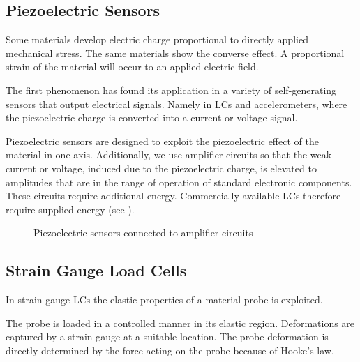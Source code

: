 \subsection{Piezoelectric Sensors}
Some materials develop electric charge proportional to directly applied mechanical stress. The same materials show the converse effect. A proportional strain of the material will occur to an applied electric field.

The first phenomenon has found its application in a variety of self-generating sensors that output electrical signals. Namely in \ac{LC}s and accelerometers, where the piezoelectric charge is converted into a current or voltage signal.

Piezoelectric sensors are designed to exploit the piezoelectric effect of the material in one axis. Additionally, we use amplifier circuits so that the weak current or voltage, induced due to the piezoelectric charge, is elevated to amplitudes that are in the range of operation of standard electronic components. These circuits require additional energy. Commercially available \ac{LC}s therefore require supplied energy (see ).

\begin{figure}[!htb]
    \centering
    \hspace{4em}
    \caption[Piezoelectric sensors in amplifier circuits \cite{webster2018measurement}]{Piezoelectric sensors connected to amplifier circuits \cite{webster2018measurement}}
    \label{fig:piezo_ampcirc}
\end{figure}


\subsection{Strain Gauge Load Cells}

In strain gauge \ac{LC}s the elastic properties of a material probe is exploited.

The probe is loaded in a controlled manner in its elastic region. Deformations are captured by a strain gauge at a suitable location. The probe deformation is directly determined by the force acting on the probe because of Hooke's law.


